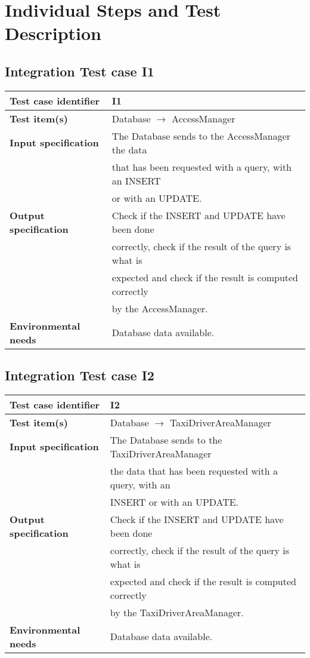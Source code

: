 \section{Individual	Steps	and	Test	Description}
	\hypertarget{chapter 3.1}{ }
	\subsection{Integration Test case I1}
		\begin{adjustbox}{max width=\textwidth}
			\begin{tabular}{ l l}
				\hline 		\textbf{Test case identifier} & I1 \\
				\hline		\textbf{Test item(s)}  & Database $\rightarrow$ AccessManager \\
				\hline		\textbf{Input specification} & The Database sends to the AccessManager the data \\ & that has been requested with a query, with an INSERT \\ & or with an UPDATE. \\
				\hline		\textbf{Output specification} & Check if the INSERT and UPDATE have been done\\ & correctly, check if the result of the query is what is\\ &  expected and check if the result is computed correctly\\ & by the AccessManager.\\
				\hline		\textbf{Environmental needs} & Database data available.\\
				\hline
			\end{tabular}
		\end{adjustbox}
	\hypertarget{chapter 3.2}{ }
	\subsection{Integration Test case I2}
		\begin{adjustbox}{max width=\textwidth}
			\begin{tabular}{ l l}
				\hline 		\textbf{Test case identifier} & I2 \\
				\hline		\textbf{Test item(s)}  & Database $\rightarrow$ TaxiDriverAreaManager \\
				\hline		\textbf{Input specification}  & The Database sends to the TaxiDriverAreaManager \\ & the data that has been requested with a query,  with an\\ & INSERT  or with an UPDATE. \\
				\hline		\textbf{Output specification} & Check if the INSERT and UPDATE have been done\\ & correctly, check if the result of the query is what is\\ &  expected and check if the result is computed correctly\\ & by the TaxiDriverAreaManager.\\
				\hline		\textbf{Environmental needs} & Database data available.\\
				\hline
			\end{tabular}
		\end{adjustbox}
	\hypertarget{chapter 3.3}{ }
